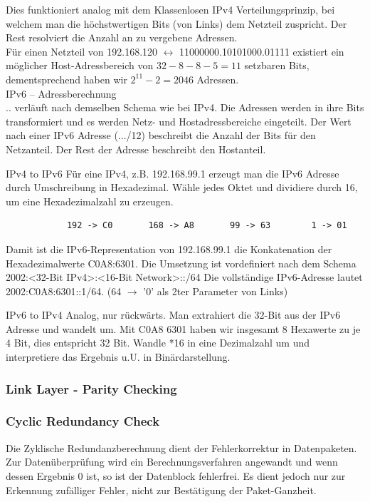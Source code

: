 \documentclass{scrartcl}
\begin{document}
        Dies funktioniert analog mit dem Klassenlosen IPv4 Verteilungsprinzip, bei welchem man die höchstwertigen Bits (von Links) dem Netzteil zuspricht. Der Rest resolviert die Anzahl an zu vergebene Adressen.\\
        Für einen Netzteil von 192.168.120 $\leftrightarrow$ 11000000.10101000.01111 existiert ein möglicher Host-Adressbereich von $32-8-8-5 = 11$ setzbaren Bits, dementsprechend haben wir $2^11 - 2 = 2046$  Adressen. \\
        
    IPv6 -- Adressberechnung\\
        .. verläuft nach demselben Schema wie bei IPv4. Die Adressen werden in ihre Bits transformiert und es werden Netz- und Hostadressbereiche eingeteilt.
        Der Wert nach einer IPv6 Adresse (.../12) beschreibt die Anzahl der Bits für den Netzanteil. Der Rest der Adresse beschreibt den Hostanteil. 
        
        IPv4 to IPv6
        Für eine IPv4, z.B. 192.168.99.1 erzeugt man die IPv6 Adresse durch Umschreibung in Hexadezimal.
        Wähle jedes Oktet und dividiere durch 16, um eine Hexadezimalzahl zu erzeugen.
        \begin{verbatim}
            192 -> C0       168 -> A8       99 -> 63        1 -> 01
        \end{verbatim} 
        Damit ist die IPv6-Representation von 192.168.99.1 die Konkatenation der Hexadezimalwerte C0A8:6301.
        Die Umsetzung ist vordefiniert nach dem Schema 2002:<32-Bit IPv4>:<16-Bit Network>::/64
        Die vollständige IPv6-Adresse lautet 2002:C0A8:6301::1/64.  (64 $\rightarrow$ '0' als 2ter Parameter von Links)
        
        IPv6 to IPv4
        Analog, nur rückwärts. Man extrahiert die 32-Bit aus der IPv6 Adresse und wandelt um.
        Mit C0A8 6301 haben wir insgesamt 8 Hexawerte zu je 4 Bit, dies entspricht 32 Bit. Wandle *16 in eine Dezimalzahl um und interpretiere das Ergebnis u.U. in Binärdarstellung.

    \subsubsection{ Link Layer - Parity Checking }
    \subsubsection{ Cyclic Redundancy Check}
    Die Zyklische Redundanzberechnung dient der Fehlerkorrektur in Datenpaketen. Zur Datenüberprüfung wird ein Berechnungsverfahren angewandt und wenn dessen Ergebnis 0 ist, so ist der Datenblock fehlerfrei. Es dient jedoch nur zur Erkennung zufälliger Fehler, nicht zur Bestätigung der Paket-Ganzheit.
    
\end{document}
